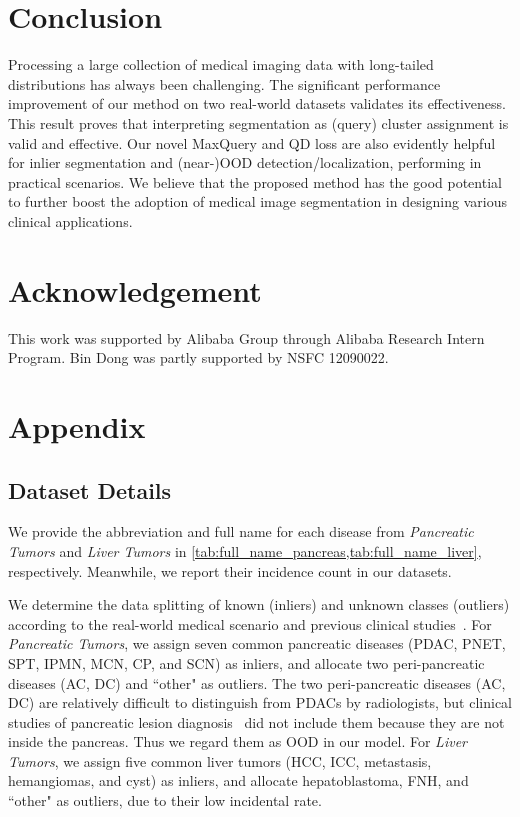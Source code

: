 \documentclass[10pt,twocolumn,letterpaper]{article}
\begin{document}
\section{Conclusion}
\label{sec:conclusion}
Processing a large collection of medical imaging data with long-tailed distributions has always been challenging. The significant performance improvement of our method on two real-world datasets  validates its effectiveness. This result proves that interpreting segmentation as (query) cluster assignment is valid and effective. Our novel MaxQuery and QD loss are also evidently helpful for inlier segmentation and (near-)OOD detection/localization, performing in practical scenarios. We believe that the proposed method has the good potential to further boost the adoption of medical image segmentation in designing various clinical applications.

\section*{Acknowledgement}
 This work was supported by Alibaba Group through Alibaba Research Intern Program. Bin Dong was partly supported by NSFC 12090022.

{\small


}
\newpage
\appendix
\section{Appendix}
\renewcommand\thefigure{A\arabic{figure}}
\renewcommand\thetable{A\arabic{table}}

\subsection{Dataset Details}
We provide the abbreviation and full name for each disease from \textit{Pancreatic Tumors} and \textit{Liver Tumors} in \cref{tab:full_name_pancreas,tab:full_name_liver}, respectively. Meanwhile, we report their incidence count in our datasets.

We determine the data splitting of known (inliers) and unknown classes (outliers) according to the real-world medical scenario and previous clinical studies~\cite{chu2022classification,springer2019multimodality}. For \textit{Pancreatic Tumors}, we assign seven common pancreatic diseases (PDAC, PNET, SPT, IPMN, MCN, CP, and SCN) as inliers, and allocate two peri-pancreatic diseases (AC, DC) and ``other" as outliers. The two peri-pancreatic diseases (AC, DC) are relatively difficult to distinguish from PDACs by radiologists, but clinical studies of pancreatic lesion diagnosis~\cite{springer2019multimodality,chu2022classification} did not include them because they are not inside the pancreas. Thus we regard them as OOD in our model. For \textit{Liver Tumors}, we assign five common liver tumors \cite{yasaka2018deep} (HCC, ICC, metastasis, hemangiomas, and cyst) as inliers, and allocate hepatoblastoma, FNH, and ``other" as outliers, due to their low incidental rate.
\end{document}
